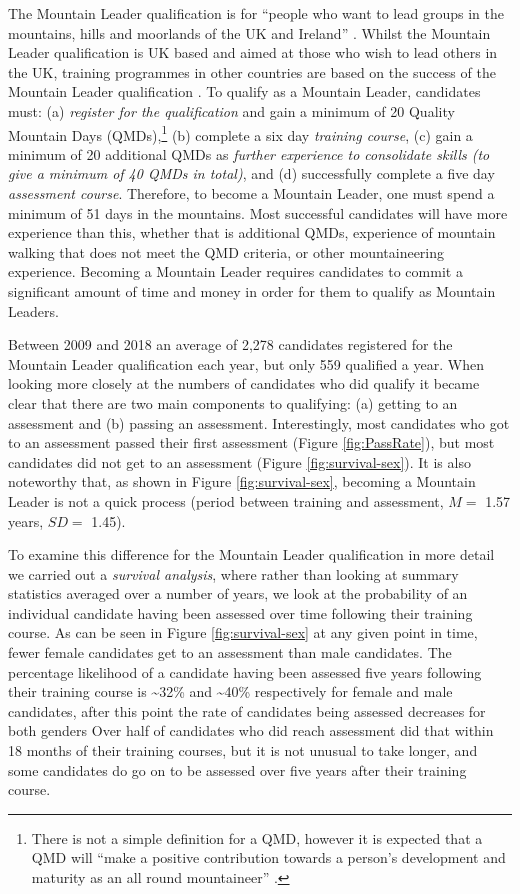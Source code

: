 \documentclass[
  12pt,
  a4paper,
]{book}
\begin{document}
The Mountain Leader qualification is for ``people who want to lead groups in the mountains, hills and moorlands of the UK and Ireland'' \citep[p 5]{MountainTrainingUK2015a}. Whilst the Mountain Leader qualification is UK based and aimed at those who wish to lead others in the UK, training programmes in other countries are based on the success of the Mountain Leader qualification \citep{UIAA2015}. To qualify as a Mountain Leader, candidates must: (a) \emph{register for the qualification} and gain a minimum of 20 Quality Mountain Days (QMDs),\footnote{There is not a simple definition for a QMD, however it is expected that a QMD will ``make a positive contribution towards a person's development and maturity as an all round mountaineer'' \citep{MountainTraining2019}.} (b) complete a six day \emph{training course}, (c) gain a minimum of 20 additional QMDs as \emph{further experience to consolidate skills (to give a minimum of 40 QMDs in total)}, and (d) successfully complete a five day \emph{assessment course}. Therefore, to become a Mountain Leader, one must spend a minimum of 51 days in the mountains. Most successful candidates will have more experience than this, whether that is additional QMDs, experience of mountain walking that does not meet the QMD criteria, or other mountaineering experience. Becoming a Mountain Leader requires candidates to commit a significant amount of time and money in order for them to qualify as Mountain Leaders.

Between 2009 and 2018 an average of 2,278 candidates registered for the Mountain Leader qualification each year, but only 559 qualified a year. When looking more closely at the numbers of candidates who did qualify it became clear that there are two main components to qualifying: (a) getting to an assessment and (b) passing an assessment. Interestingly, most candidates who got to an assessment passed their first assessment (Figure \ref{fig:PassRate}), but most candidates did not get to an assessment (Figure \ref{fig:survival-sex}). It is also noteworthy that, as shown in Figure \ref{fig:survival-sex}, becoming a Mountain Leader is not a quick process (period between training and assessment, \(M =\) 1.57 years, \(SD =\) 1.45).

To examine this difference for the Mountain Leader qualification in more detail we carried out a \emph{survival analysis}, where rather than looking at summary statistics averaged over a number of years, we look at the probability of an individual candidate having been assessed over time following their training course. As can be seen in Figure \ref{fig:survival-sex} at any given point in time, fewer female candidates get to an assessment than male candidates. The percentage likelihood of a candidate having been assessed five years following their training course is \textasciitilde32\% and \textasciitilde40\% respectively for female and male candidates, after this point the rate of candidates being assessed decreases for both genders Over half of candidates who did reach assessment did that within 18 months of their training courses, but it is not unusual to take longer, and some candidates do go on to be assessed over five years after their training course.
\end{document}
